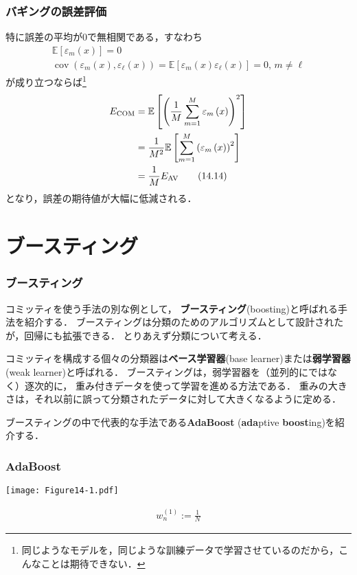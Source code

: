 \documentclass[10pt,hyperref={unicode}]{beamer}
\DeclareMathOperator*{\cov}{cov}
\newcommand{\parentheses}[1]{\left(#1\right)}
\newcommand{\brackets}[1]{\left[#1\right]}
\begin{document}
\begin{frame}
\frametitle{バギングの誤差評価}
特に誤差の平均が$0$で無相関である，すなわち
\begin{gather}
    \mathbb{E}\brackets{\varepsilon_m\parentheses{x}} = 0
    \tag{14.12} \\
    \cov\parentheses{\varepsilon_{m}\parentheses{x},\varepsilon_\ell\parentheses{x}}
    = \mathbb{E}\brackets{\varepsilon_m\parentheses{x}\varepsilon_\ell\parentheses{x}} = 0,\, m \neq \ell
    \tag{14.13}
\end{gather}
が成り立つならば\footnote[frame]{同じようなモデルを，同じような訓練データで学習させているのだから，こんなことは期待できない．}
\begin{align}
    E_\mathrm{COM}
    &= \mathbb{E}\brackets{\parentheses{\frac{1}{M}\sum_{m = 1}^M \varepsilon_m\parentheses{x}}^2} \notag \\
    &= \frac{1}{M^2}\mathbb{E}\brackets{\sum_{m = 1}^M \parentheses{\varepsilon_m\parentheses{x}}^2} \notag \\
    &= \frac{1}{M}E_\mathrm{AV} \tag{14.14}
\end{align}
となり，誤差の期待値が大幅に低減される．
\end{frame}

\section{ブースティング}
\begin{frame}
\frametitle{ブースティング}
コミッティを使う手法の別な例として，
\textbf{ブースティング}(boosting)と呼ばれる手法を紹介する．
ブースティングは分類のためのアルゴリズムとして設計されたが，回帰にも拡張できる．
とりあえず分類について考える．

\bigskip

コミッティを構成する個々の分類器は\textbf{ベース学習器}(base learner)または\textbf{弱学習器}(weak learner)と呼ばれる．
ブースティングは，弱学習器を（並列的にではなく）逐次的に，
重み付きデータを使って学習を進める方法である．
重みの大きさは，それ以前に誤って分類されたデータに対して大きくなるように定める．


\bigskip

ブースティングの中で代表的な手法である\textbf{AdaBoost} (\textbf{ada}ptive \textbf{boost}ing)を紹介する．
\end{frame}

\begin{frame}
\frametitle{AdaBoost}
\begin{center}
    \texttt{[image: Figure14-1.pdf]}
\end{center}

\bigskip

\begin{leftbar}
{\footnotesize
\begin{algorithmic}
    \begin{align*}
        w_n^{\parentheses{1}} := \frac{1}{N}
    \end{align*}
\EndFor
\end{algorithmic}
}
\end{leftbar}
\end{frame}
\end{document}
